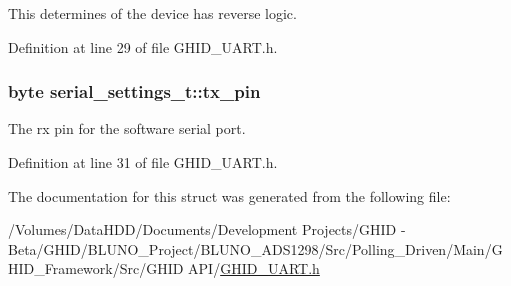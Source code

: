 \-This determines of the device has reverse logic. 



\-Definition at line 29 of file \-G\-H\-I\-D\-\_\-\-U\-A\-R\-T.\-h.

\hypertarget{structserial__settings__t_a0f93cf06b293d16a9988f160ff6bd796}{
\subsubsection[{tx\-\_\-pin}]{\setlength{\rightskip}{0pt plus 5cm}byte {\bf serial\-\_\-settings\-\_\-t\-::tx\-\_\-pin}}}\label{structserial__settings__t_a0f93cf06b293d16a9988f160ff6bd796}


\-The rx pin for the software serial port. 



\-Definition at line 31 of file \-G\-H\-I\-D\-\_\-\-U\-A\-R\-T.\-h.



\-The documentation for this struct was generated from the following file\-:\begin{DoxyCompactItemize}
\item 
/\-Volumes/\-Data\-H\-D\-D/\-Documents/\-Development Projects/\-G\-H\-I\-D -\/ Beta/\-G\-H\-I\-D/\-B\-L\-U\-N\-O\-\_\-\-Project/\-B\-L\-U\-N\-O\-\_\-\-A\-D\-S1298/\-Src/\-Polling\-\_\-\-Driven/\-Main/\-G\-H\-I\-D\-\_\-\-Framework/\-Src/\-G\-H\-I\-D A\-P\-I/\hyperlink{_g_h_i_d___u_a_r_t_8h}{\-G\-H\-I\-D\-\_\-\-U\-A\-R\-T.\-h}\end{DoxyCompactItemize}
